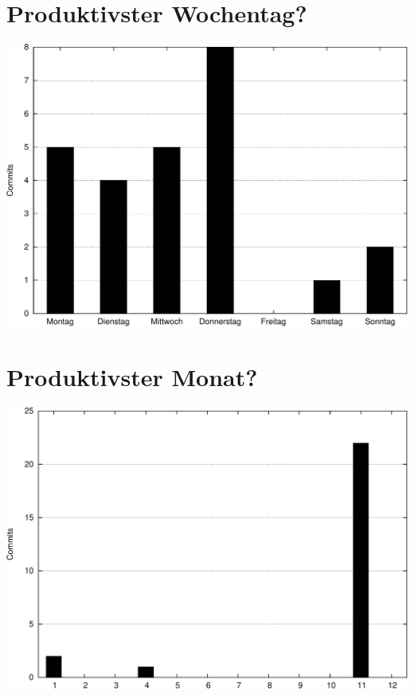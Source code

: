\documentclass[12pt,a4paper,ngerman]{scrartcl}
\begin{document}
\section*{Produktivster Wochentag?}
\includegraphics[width=14cm]{stats/day_of_week-crop}%

\section*{Produktivster Monat?}%
\includegraphics[width=14cm]{stats/month_of_year-crop}%
\end{document}
